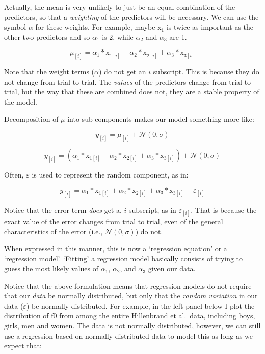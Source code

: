 \documentclass[
]{book}
\begin{document}
Actually, the mean is very unlikely to just be an equal combination of the predictors, so that a \emph{weighting} of the predictors will be necessary. We can use the symbol \(\alpha\) for these weights. For example, maybe \(\mathrm{x}_{1}\) is twice as important as the other two predictors and so \(\alpha_1\) is 2, while \(\alpha_2\) and \(\alpha_3\) are 1.

\[
\mu_{[i]} = \alpha_1*\mathrm{x}_{1[i]} + \alpha_2*\mathrm{x}_{2[i]} + \alpha_3*\mathrm{x}_{3[i]}  
\label{eq:6}
\]

Note that the weight terms (\(\alpha\)) do not get an \(i\) subscript. This is because they do not change from trial to trial. The \emph{values} of the predictors change from trial to trial, but the way that these are combined does not, they are a stable property of the model.

Decomposition of \(\mu\) into sub-components makes our model something more like:

\[
y_{[i]} = \mu_{[i]} + \mathcal{N}(0,\sigma)  
\label{eq:7}
\]

\[
y_{[i]} =  (\alpha_1*\mathrm{x}_{1[i]} + \alpha_2*\mathrm{x}_{2[i]} + \alpha_3*\mathrm{x}_{3[i]} ) + \mathcal{N}(0,\sigma)  
\label{eq:8}
\]

Often, \(\varepsilon\) is used to represent the random component, as in:

\[
y_{[i]} = \alpha_1*\mathrm{x}_{1[i]} + \alpha_2*\mathrm{x}_{2[i]} + \alpha_3*\mathrm{x}_{3[i]}+ \varepsilon_{[i]}
\label{eq:9}
\]

Notice that the error term \emph{does} get a, \(i\) subscript, as in \(\varepsilon_{[i]}\). That is because the exact value of the error changes from trial to trial, even of the general characteristics of the error (i.e., \(\mathcal{N}(0,\sigma)\)) do not.

When expressed in this manner, this is now a `regression equation' or a `regression model'. `Fitting' a regression model basically consists of trying to guess the most likely values of \(\alpha_1\), \(\alpha_2\), and \(\alpha_3\) given our data.

Notice that the above formulation means that regression models do not require that our \emph{data} be normally distributed, but only that the \emph{random variation} in our data (\(\varepsilon\)) be normally distributed. For example, in the left panel below I plot the distribution of f0 from among the entire Hillenbrand et al.~data, including boys, girls, men and women. The data is not normally distributed, however, we can still use a regression based on normally-distributed data to model this as long as we expect that:
\end{document}
